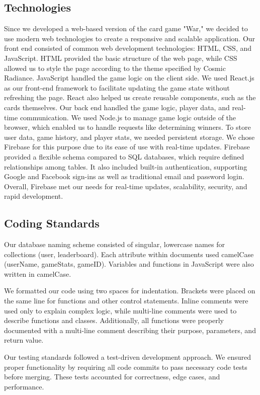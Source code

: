 \subsection{Technologies}
Since we developed a web-based version of the card game "War," we decided to use modern web technologies to create a responsive and scalable application. Our front end consisted of common web development technologies: HTML, CSS, and JavaScript. HTML provided the basic structure of the web page, while CSS allowed us to style the page according to the theme specified by Cosmic Radiance. JavaScript handled the game logic on the client side. We used React.js as our front-end framework to facilitate updating the game state without refreshing the page. React also helped us create reusable components, such as the cards themselves.
Our back end handled the game logic, player data, and real-time communication. We used Node.js to manage game logic outside of the browser, which enabled us to handle requests like determining winners.
To store user data, game history, and player stats, we needed persistent storage. We chose Firebase for this purpose due to its ease of use with real-time updates. Firebase provided a flexible schema compared to SQL databases, which require defined relationships among tables. It also included built-in authentication, supporting Google and Facebook sign-ins as well as traditional email and password login. Overall, Firebase met our needs for real-time updates, scalability, security, and rapid development.




\subsection{Coding Standards}
Our database naming scheme consisted of singular, lowercase names for collections (user, leaderboard). Each attribute within documents used camelCase (userName, gameStats, gameID). Variables and functions in JavaScript were also written in camelCase.

We formatted our code using two spaces for indentation. Brackets were placed on the same line for functions and other control statements. Inline comments were used only to explain complex logic, while multi-line comments were used to describe functions and classes. Additionally, all functions were properly documented with a multi-line comment describing their purpose, parameters, and return value.

Our testing standards followed a test-driven development approach. We ensured proper functionality by requiring all code commits to pass necessary code tests before merging. These tests accounted for correctness, edge cases, and performance.

